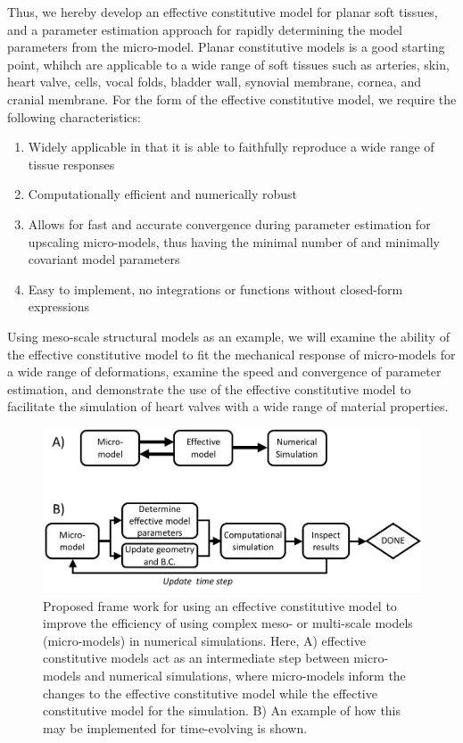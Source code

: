     Thus, we hereby develop an effective constitutive model for planar soft tissues, and a parameter estimation approach for rapidly determining the model parameters from the micro-model. Planar constitutive models is a good starting point, whihch are applicable to a wide range of soft tissues such as arteries, skin, heart valve, cells, vocal folds, bladder wall, synovial membrane, cornea, and cranial membrane. For the form of the effective constitutive model, we require the following characteristics:
\begin{enumerate}
    \item Widely applicable in that it is able to faithfully reproduce a wide range of tissue responses
    \item Computationally efficient and numerically robust
    \item Allows for fast and accurate convergence during parameter estimation for upscaling micro-models, thus having the minimal number of and minimally covariant model parameters
    \item Easy to implement, no integrations or functions without closed-form expressions
\end{enumerate}
    Using meso-scale structural models as an example, we will examine the ability of the effective constitutive model to fit the mechanical response of micro-models for a wide range of deformations, examine the speed and convergence of parameter estimation, and demonstrate the use of the effective constitutive model to facilitate the simulation of heart valves with a wide range of material properties.
    
\begin{figure}
\centering
\includegraphics[width=\textwidth]{Images/chapter5/simulationframework}
\caption{Proposed frame work for using an effective constitutive model to improve the efficiency of using complex meso- or multi-scale models (micro-models) in numerical simulations. Here, A) effective constitutive models act as an intermediate step between micro-models and numerical simulations, where micro-models inform the changes to the effective constitutive model while the effective constitutive model for the simulation. B) An example of how this may be implemented for time-evolving is shown.}
\label{fig:simulationframework}
\end{figure}
    
    
    
    
    
    
    
    
